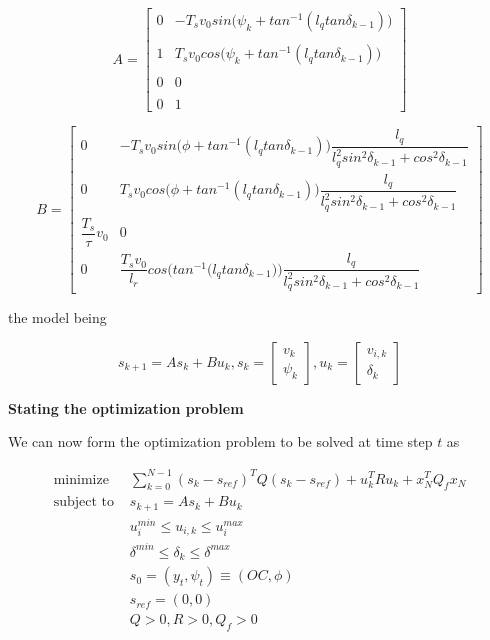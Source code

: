 \begin{equation}
  A =
  \begin{bmatrix}
     0 & -T_s v_0 sin\Big(\psi_k + tan^{-1} (l_q tan\delta_{k-1})\Big) \\\\
     1 & T_s v_0 cos\Big(\psi_k + tan^{-1} (l_q tan\delta_{k-1})\Big) \\\\
     0 & 0 \\\\
     0 & 1
  \end{bmatrix}
\end{equation}


\begin{equation}
  B =
  \begin{bmatrix}
    0 & -T_s v_0 sin\Big(\phi + tan^{-1} (l_q tan\delta_{k-1})\Big) \dfrac{l_q}{l_q^2 sin^2\delta_{k-1} + cos^2\delta_{k-1}} \\
    0 & T_s v_0 cos\Big(\phi + tan^{-1} (l_q tan\delta_{k-1})\Big) \dfrac{l_q}{l_q^2 sin^2\delta_{k-1} + cos^2\delta_{k-1}} \\
    \dfrac{T_s}{\tau} v_0 & 0 \\
    0 & \dfrac{T_s v_0}{l_r} cos\Bigg(tan^{-1} \Big(l_q tan\delta_{k-1}\Big)\Bigg) \dfrac{l_q}{l_q^2 sin^2\delta_{k-1} + cos^2\delta_{k-1}}
  \end{bmatrix}
\end{equation}

the model being

\begin{equation}
  s_{k+1} = A s_k + B u_k,
  s_k=
  \begin{bmatrix}
    v_{k} \\
    \psi_{k}
  \end{bmatrix},
  u_k=
  \begin{bmatrix}
    v_{i,k} \\
    \delta_{k}
  \end{bmatrix}
\end{equation}



\textbf{Stating the optimization problem}

We can now form the optimization problem to be solved at time step $t$ as

\begin{align}
  \text{minimize }    & \sum\limits_{k=0}^{N-1} (s_k - s_{ref})^T Q (s_k - s_{ref}) + u_k^T R u_k + x_N^T Q_f x_N \\
  \text{subject to }  & s_{k+1} = A s_k + B u_k \\
                      & u_{i}^{min} \leq u_{i,k} \leq u_{i}^{max} \\
                      & \delta^{min} \leq \delta_k \leq \delta^{max} \\
                      & s_0 = (y_t, \psi_t) \equiv (OC, \phi)\\
                      & s_{ref} = (0,0)\\
                      & Q > 0, R > 0, Q_f > 0
\end{align}
